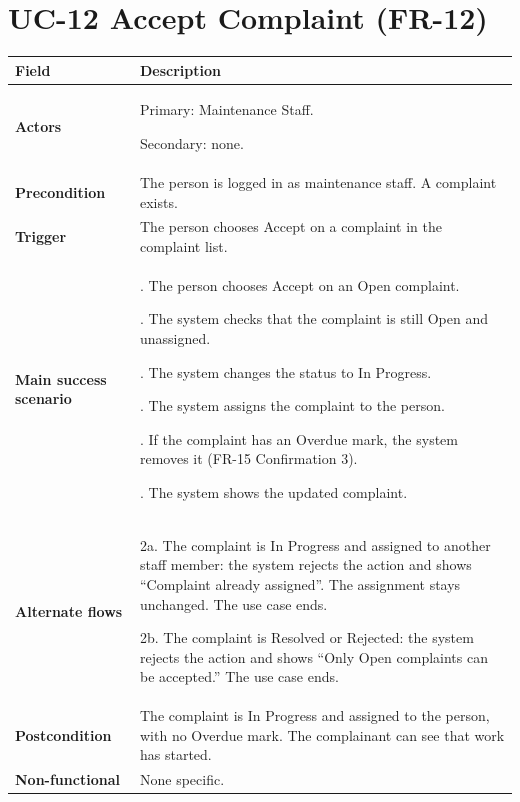 \documentclass[11pt,a4paper]{report}
\begin{document}
\section{UC-12 Accept Complaint (FR-12)}
\begin{longtable}{|>{\raggedright\arraybackslash}p{3.0cm}|>{\raggedright\arraybackslash}p{12.4cm}|}
\hline \textbf{Field} & \textbf{Description} \\ \hline \endhead
\textbf{Actors} & Primary: Maintenance Staff.\par\smallskip Secondary: none. \\ \hline
\textbf{Precondition} & The person is logged in as maintenance staff. A complaint exists. \\ \hline
\textbf{Trigger} & The person chooses Accept on a complaint in the complaint list. \\ \hline
\textbf{Main success scenario} & 1. The person chooses Accept on an Open complaint.\par\smallskip 2. The system checks that the complaint is still Open and unassigned.\par\smallskip 3. The system changes the status to In Progress.\par\smallskip 4. The system assigns the complaint to the person.\par\smallskip 5. If the complaint has an Overdue mark, the system removes it (FR-15 Confirmation 3).\par\smallskip 6. The system shows the updated complaint. \\ \hline
\textbf{Alternate flows} & 2a. The complaint is In Progress and assigned to another staff member: the system rejects the action and shows ``Complaint already assigned''. The assignment stays unchanged. The use case ends.\par\smallskip 2b. The complaint is Resolved or Rejected: the system rejects the action and shows ``Only Open complaints can be accepted.'' The use case ends. \\ \hline
\textbf{Postcondition} & The complaint is In Progress and assigned to the person, with no Overdue mark. The complainant can see that work has started. \\ \hline
\textbf{Non-functional} & None specific. \\ \hline
\end{longtable}
\end{document}

